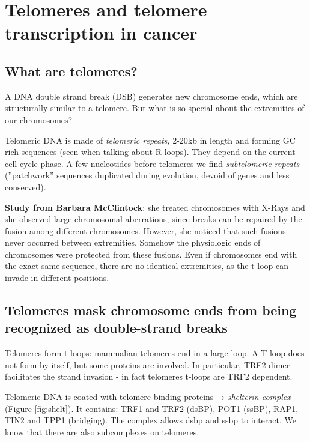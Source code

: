 \graphicspath{{chapters/_resources/}}

\chapter{Telomeres and telomere transcription in cancer}

\hypertarget{what-are-telomeres}{%
\section{What are telomeres?}\label{what-are-telomeres}}

A DNA double strand break (DSB) generates new chromosome ends, which are
structurally similar to a telomere. But what is so special about the
extremities of our chromosomes?

Telomeric DNA is made of \emph{telomeric repeats}, 2-20kb in length and
forming GC rich sequences (seen when talking about R-loops). They depend
on the current cell cycle phase. A few nucleotides before telomeres we
find \emph{subtelomeric repeats} (''patchwork'' sequences duplicated
during evolution, devoid of genes and less conserved).

\textbf{Study from Barbara McClintock}: she treated chromosomes with
X-Rays and she observed large chromosomal aberrations, since breaks can
be repaired by the fusion among different chromosomes. However, she
noticed that such fusions never occurred between extremities. Somehow
the physiologic ends of chromosomes were protected from these fusions.
Even if chromosomes end with the exact same sequence, there are no
identical extremities, as the t-loop can invade in different positions.

\hypertarget{telomeres-mask-chromosome-ends-from-being-recognized-as-double-strand-breaks}{%
\section{Telomeres mask chromosome ends from being recognized as double-strand breaks}\label{telomeres-mask-chromosome-ends-from-being-recognized-as-double-strand-breaks}}

Telomeres form t-loops: mammalian telomeres end in a large loop. A
T-loop does not form by itself, but some proteins are involved. In
particular, TRF2 dimer facilitates the strand invasion - in fact
telomeres t-loops are TRF2 dependent.

Telomeric DNA is coated with telomere binding proteins → \emph{shelterin
complex} (Figure \ref{fig:shelt}). It contains: TRF1 and TRF2 (dsBP), POT1 (ssBP), RAP1, TIN2 and
TPP1 (bridging). The complex allows dsbp and ssbp to interact. We know
that there are also subcomplexes on telomeres.

